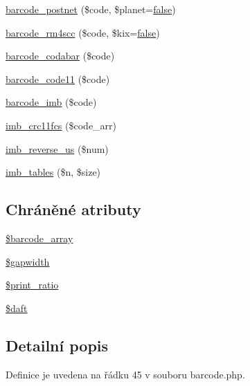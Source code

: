 \begin{DoxyCompactItemize}
\item 
\hyperlink{class_p_d_f_barcode_a2690085bcde747ffd9a9b59f4c1be162}{barcode\-\_\-postnet} (\$code, \$planet=\hyperlink{ttfontsuni_8php_afbaa04e5cc97693dc668b3c45d3dd740}{false})
\item 
\hyperlink{class_p_d_f_barcode_acabead2872f3752cac01b22f956fb540}{barcode\-\_\-rm4scc} (\$code, \$kix=\hyperlink{ttfontsuni_8php_afbaa04e5cc97693dc668b3c45d3dd740}{false})
\item 
\hyperlink{class_p_d_f_barcode_aac23b8bda10a6dc54f3b8e7e35f3debf}{barcode\-\_\-codabar} (\$code)
\item 
\hyperlink{class_p_d_f_barcode_adc3812bc69654a5907700e406226a146}{barcode\-\_\-code11} (\$code)
\item 
\hyperlink{class_p_d_f_barcode_abc4c2f6b05f18a7142880f18eb98c1ba}{barcode\-\_\-imb} (\$code)
\item 
\hyperlink{class_p_d_f_barcode_abc4644f8b76e9f8aebc09ea9d701c6c1}{imb\-\_\-crc11fcs} (\$code\-\_\-arr)
\item 
\hyperlink{class_p_d_f_barcode_a3f0945be266f6c46a78f1a41b78c71c8}{imb\-\_\-reverse\-\_\-us} (\$num)
\item 
\hyperlink{class_p_d_f_barcode_ab5570763a37d927be47a3cabcfd10a78}{imb\-\_\-tables} (\$n, \$size)
\end{DoxyCompactItemize}
\subsection*{Chráněné atributy}
\begin{DoxyCompactItemize}
\item 
\hyperlink{class_p_d_f_barcode_a52fad3e8e358ef299beb17205cd94d37}{\$barcode\-\_\-array}
\item 
\hyperlink{class_p_d_f_barcode_a79ea969bd740650de0ea9b910c463dd5}{\$gapwidth}
\item 
\hyperlink{class_p_d_f_barcode_a06ab6aded68c4acd2d2846a2d9d8beb2}{\$print\-\_\-ratio}
\item 
\hyperlink{class_p_d_f_barcode_a2e2466cd3f9c0f8a3a2930173b8cb3c1}{\$daft}
\end{DoxyCompactItemize}


\subsection{Detailní popis}


Definice je uvedena na řádku 45 v souboru barcode.\-php.



